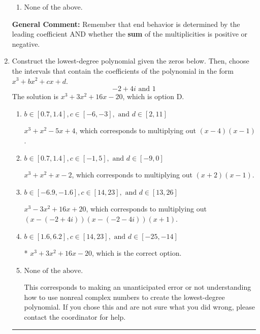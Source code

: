 \documentclass{extbook}[14pt]
\newcommand{\litem}[1]{\item #1

\rule{\textwidth}{0.4pt}}
\begin{document}
\begin{enumerate}
{\begin{enumerate}[label=\Alph*.]
\begin{multicols}{2}
\end{multicols}\item None of the above.\end{enumerate}
\textbf{General Comment:} Remember that end behavior is determined by the leading coefficient AND whether the \textbf{sum} of the multiplicities is positive or negative.
}
\litem{
Construct the lowest-degree polynomial given the zeros below. Then, choose the intervals that contain the coefficients of the polynomial in the form $x^3+bx^2+cx+d$.
\[ -2 + 4 i \text{ and } 1 \]The solution is \( x^{3} +3 x^{2} +16 x -20 \), which is option D.\begin{enumerate}[label=\Alph*.]
\item \( b \in [0.7, 1.4], c \in [-6, -3], \text{ and } d \in [2, 11] \)

$x^{3} + x^{2} -5 x + 4$, which corresponds to multiplying out $(x -4)(x -1)$.
\item \( b \in [0.7, 1.4], c \in [-1, 5], \text{ and } d \in [-9, 0] \)

$x^{3} + x^{2} +x -2$, which corresponds to multiplying out $(x + 2)(x -1)$.
\item \( b \in [-6.9, -1.6], c \in [14, 23], \text{ and } d \in [13, 26] \)

$x^{3} -3 x^{2} +16 x + 20$, which corresponds to multiplying out $(x-(-2 + 4 i))(x-(-2 - 4 i))(x + 1)$.
\item \( b \in [1.6, 6.2], c \in [14, 23], \text{ and } d \in [-25, -14] \)

* $x^{3} +3 x^{2} +16 x -20$, which is the correct option.
\item \( \text{None of the above.} \)

This corresponds to making an unanticipated error or not understanding how to use nonreal complex numbers to create the lowest-degree polynomial. If you chose this and are not sure what you did wrong, please contact the coordinator for help.
\end{enumerate}

}
\end{enumerate}
\end{document}
